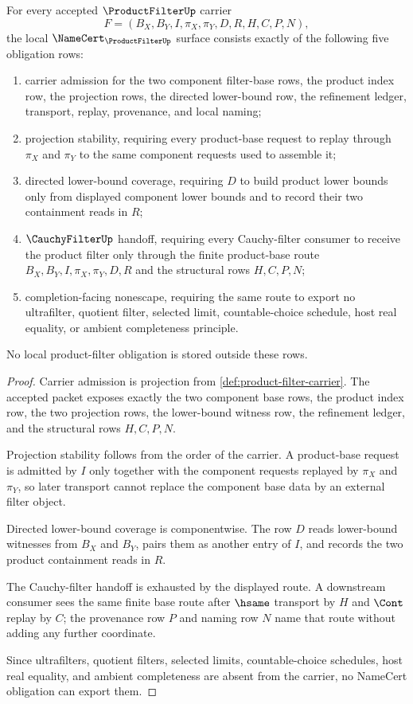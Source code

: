 \begin{theorem}
\label{thm:product-filter-namecert-obligations}
For every accepted $\ProductFilterUp$ carrier
$$
F=(B_X,B_Y,I,\pi_X,\pi_Y,D,R,H,C,P,N),
$$
the local $\NameCert_{\ProductFilterUp}$ surface consists exactly of the following five obligation rows:
\begin{enumerate}
\item carrier admission for the two component filter-base rows, the product index row, the projection rows, the directed lower-bound row, the refinement ledger, transport, replay, provenance, and local naming;
\item projection stability, requiring every product-base request to replay through $\pi_X$ and $\pi_Y$ to the same component requests used to assemble it;
\item directed lower-bound coverage, requiring $D$ to build product lower bounds only from displayed component lower bounds and to record their two containment reads in $R$;
\item $\CauchyFilterUp$ handoff, requiring every Cauchy-filter consumer to receive the product filter only through the finite product-base route $B_X,B_Y,I,\pi_X,\pi_Y,D,R$ and the structural rows $H,C,P,N$;
\item completion-facing nonescape, requiring the same route to export no ultrafilter, quotient filter, selected limit, countable-choice schedule, host real equality, or ambient completeness principle.
\end{enumerate}
No local product-filter obligation is stored outside these rows.
\end{theorem}
\begin{proof}
Carrier admission is projection from \autoref{def:product-filter-carrier}. The accepted packet exposes exactly the two component base rows, the product index row, the two projection rows, the lower-bound witness row, the refinement ledger, and the structural rows $H,C,P,N$.

Projection stability follows from the order of the carrier. A product-base request is admitted by $I$ only together with the component requests replayed by $\pi_X$ and $\pi_Y$, so later transport cannot replace the component base data by an external filter object.

Directed lower-bound coverage is componentwise. The row $D$ reads lower-bound witnesses from $B_X$ and $B_Y$, pairs them as another entry of $I$, and records the two product containment reads in $R$.

The Cauchy-filter handoff is exhausted by the displayed route. A downstream consumer sees the same finite base route after $\hsame$ transport by $H$ and $\Cont$ replay by $C$; the provenance row $P$ and naming row $N$ name that route without adding any further coordinate.

Since ultrafilters, quotient filters, selected limits, countable-choice schedules, host real equality, and ambient completeness are absent from the carrier, no NameCert obligation can export them.
\end{proof}

